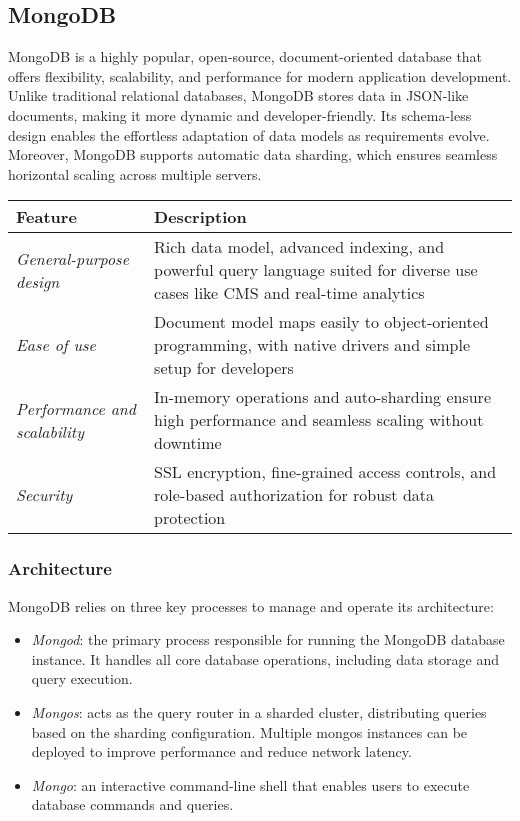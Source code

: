 \subsection{MongoDB}
MongoDB is a highly popular, open-source, document-oriented database that offers flexibility, scalability, and performance for modern application development. 
Unlike traditional relational databases, MongoDB stores data in JSON-like documents, making it more dynamic and developer-friendly. 
Its schema-less design enables the effortless adaptation of data models as requirements evolve. 
Moreover, MongoDB supports automatic data sharding, which ensures seamless horizontal scaling across multiple servers.
\begin{table}[H]
    \centering
    \begin{tabular}{|l|p{10cm}|}
    \hline
    \textbf{Feature} & \textbf{Description} \\ \hline
    \textit{General-purpose design} & Rich data model, advanced indexing, and powerful query language suited for diverse use cases like CMS and real-time analytics \\ \hline
    \textit{Ease of use} & Document model maps easily to object-oriented programming, with native drivers and simple setup for developers \\ \hline
    \textit{Performance and scalability} & In-memory operations and auto-sharding ensure high performance and seamless scaling without downtime \\ \hline
    \textit{Security} & SSL encryption, fine-grained access controls, and role-based authorization for robust data protection \\ \hline
    \end{tabular}
\end{table}

\subsubsection{Architecture}
MongoDB relies on three key processes to manage and operate its architecture:
\begin{itemize} 
    \item \textit{Mongod}: the primary process responsible for running the MongoDB database instance. 
        It handles all core database operations, including data storage and query execution. 
    \item \textit{Mongos}: acts as the query router in a sharded cluster, distributing queries based on the sharding configuration. 
        Multiple mongos instances can be deployed to improve performance and reduce network latency. 
    \item \textit{Mongo}: an interactive command-line shell that enables users to execute database commands and queries. 
\end{itemize}

